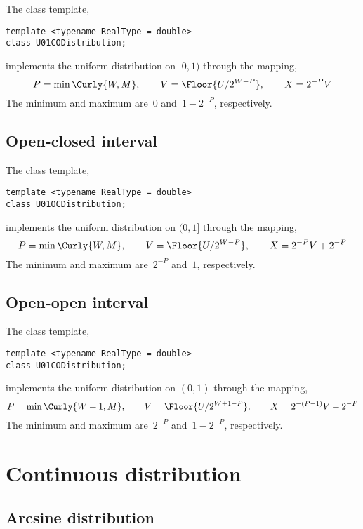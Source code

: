 The class template,
\begin{verbatim}
template <typename RealType = double>
class U01CODistribution;
\end{verbatim}
implements the uniform distribution on $[0, 1)$ through the mapping,
\begin{equation*}
  P = \min\Curly{W, M},\qquad
  V = \Floor{U / 2^{W - P}},\qquad
  X = 2^{-P} V
\end{equation*}
The minimum and maximum are~$0$ and~$1 - 2^{-P}$, respectively.

\subsection{Open-closed interval}
\label{sub:Open-closed interval}

The class template,
\begin{verbatim}
template <typename RealType = double>
class U01OCDistribution;
\end{verbatim}
implements the uniform distribution on $(0, 1]$ through the mapping,
\begin{equation*}
  P = \min\Curly{W, M},\qquad
  V = \Floor{U / 2^{W - P}},\qquad
  X = 2^{-P} V + 2^{-P}
\end{equation*}
The minimum and maximum are~$2^{-P}$ and~$1$, respectively.

\subsection{Open-open interval}
\label{sub:Open-open interval}

The class template,
\begin{verbatim}
template <typename RealType = double>
class U01CODistribution;
\end{verbatim}
implements the uniform distribution on $(0, 1)$ through the mapping,
\begin{equation*}
  P = \min\Curly{W + 1, M},\qquad
  V = \Floor{U / 2^{W + 1 - P}},\qquad
  X = 2^{-(P - 1)} V + 2^{-P}
\end{equation*}
The minimum and maximum are~$2^{-P}$ and~$1 - 2^{-P}$, respectively.

\section{Continuous distribution}
\label{sec:Continuous distribution}

\subsection{Arcsine distribution}
\label{sub:Arcsine distribution}

